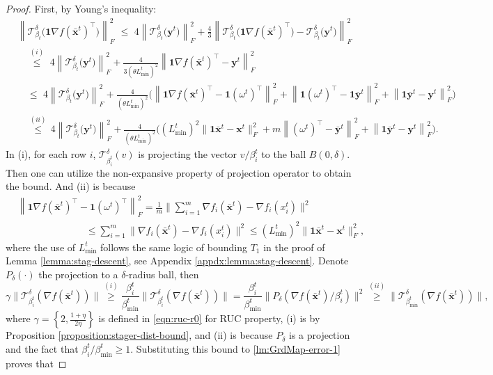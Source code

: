 \documentclass{article}
\newcommand{\cT}{\mathcal{T}}
\newcommand{\ctdb}{\mathcal{T}^\delta_{\beta_t}}
\newcommand{\ctdbi}{\mathcal{T}^\delta_{\beta_i^t}}
\newcommand{\bxt}{\mathbf{x}^t}
\newcommand{\byt}{\mathbf{y}^t}
\newcommand{\xit}{x_{i}^{t}}
\newcommand{\bbxt}{\bar{\mathbf{x}}^t}
\newcommand{\bbyt}{\bar{\mathbf{y}}^t}
\newcommand{\bone}{\mathbf{1}}
\begin{document}
\begin{proof}
First, by Young's inequality: 
\begin{align}
\label{lm:GrdMap-error-1}
&\left\|\ctdb\big(\bone\nabla f(\bbxt)^\top\big)\right\|_F^2 \,\, \leq  \,\,4\left\|\ctdb\big(\byt\big)\right\|_F^2 + \frac{4}{3}\left\|\ctdb\big(\bone\nabla f(\bbxt)^\top\big) - \ctdb\big(\byt\big)\right\|_F^2\nonumber\\
& \quad\overset{(i)}{\leq} \,\, 4\left\|\ctdb\big(\byt\big)\right\|_F^2 + \frac{4}{3(\theta L_{\min}^t)^2} \left\|\bone\nabla f(\bbxt)^\top- \byt\right\|_F^2\\
& \quad\leq \,\, 4\left\|\ctdb\big(\byt\big)\right\|_F^2 + \frac{4}{(\theta L_{\min}^t)^2} \Big(\left\|\bone\nabla f(\bbxt)^\top-\bone(\omega^t)^\top\right\|_F^2 + \left\|  \bone(\omega^t)^\top - \bone\bbyt\right\|_F^2 + \left\|\bone\bbyt - \byt\right\|_F^2\Big)\nonumber\\
& \quad\!\overset{(ii)}{\leq}  \, 4\left\|\ctdb\big(\byt\big)\right\|_F^2 + \frac{4}{(\theta L_{\min}^t)^2} \Big((L_{\min}^t)^2\big\|\bone\bbxt-\bxt\big\|_F^2 + m\left\|   (\omega^t)^\top -  \bbyt\right\|_F^2 + \left\|\bone\bbyt - \byt\right\|_F^2\Big).\nonumber
\end{align} 
In (i), for each row $i$, $\cT_{\beta_i^t}^\delta(v)$ is projecting the vector $v/\beta_i^t$ to the ball $B(0,\delta)$. Then one can utilize the non-expansive property of projection operator to obtain the bound. And (ii) is because
\begin{align*}
& \left\|\bone\nabla f(\bbxt)^{\top}-\bone(\omega^t)^{\top}\right\|_F^2 = \frac{1}{m}\Big\|\sum_{i=1}^m\nabla f_i(\bbxt)-\nabla f_i(\xit)\Big\|^2\\    
&\qquad\qquad\qquad\quad\leq  \sum_{i=1}^m\!\big\| \nabla f_i(\bbxt)-\nabla f_i(\xit)\big\|^2 
\leq  (L_{\min}^t)^2\big\|\bone\bbxt-\bxt\big\|_F^2,
\end{align*} 
where the use of $L_{\min}^t$ follows the same logic of bounding $T_1$ in the proof of Lemma \ref{lemma:stag-descent}, see Appendix \ref{appdx:lemma:stag-descent}. Denote $P_\delta(\cdot)$ the projection to a $\delta$-radius ball, then 
$$\gamma\big\|\ctdbi(\nabla f(\bbxt))\big\|\overset{(i)}{\geq} \frac{\beta_i^t}{\beta_{\min}^t}\big\|\ctdbi(\nabla f(\bbxt))\big\| = \frac{\beta_i^t}{\beta_{\min}^t}\big\|P_\delta(\nabla f(\bbxt)/\beta_i^t)\big\|^2\overset{(ii)}{\geq} \big\|\cT_{\beta_{\min}^t}^\delta(\nabla f(\bbxt))\big\|,$$
where $\gamma = \left\{2,\frac{1+\eta}{2\eta}\right\}$ is defined in \eqref{eqn:ruc-r0} for RUC property, (i) is by Proposition \ref{proposition:stager-dist-bound}, and (ii) is because $P_\delta$ is a projection and the fact that $\beta_i^t/\beta_{\min}^t\geq1$. Substituting this bound to \eqref{lm:GrdMap-error-1} proves that 

\end{proof}
\end{document}
